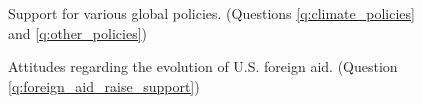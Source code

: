 \begin{figure}[h!] %
    \caption{Support for various global policies. (Questions \ref{q:climate_policies} and \ref{q:other_policies})}\label{fig:support_likert}
\end{figure}



\begin{figure}[h!]
    \caption{Attitudes regarding the evolution of U.S. foreign aid. (Question \ref{q:foreign_aid_raise_support})}\label{fig:foreign_aid_raise_support}
\end{figure}

